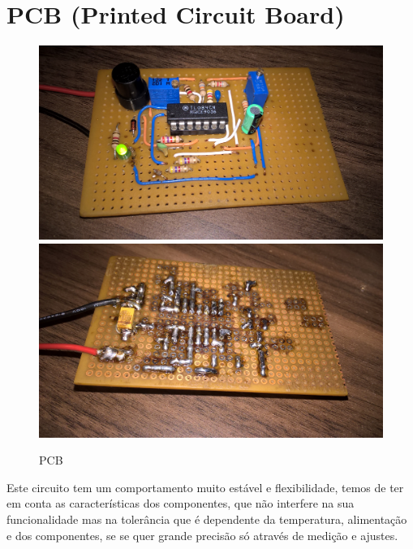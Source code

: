 \section{PCB (Printed Circuit Board)}
\begin{figure}[ht]
\begin{center}
	\includegraphics[scale=0.07]{./image/placa_1.jpg} \hspace{0.2cm}
	\includegraphics[scale=0.07]{./image/placa_2.jpg}
\end{center}
\caption{PCB}
\end{figure}\par
Este circuito tem um comportamento muito estável e flexibilidade, temos de ter em conta as características dos componentes, que não interfere na sua funcionalidade mas na tolerância que é dependente da temperatura, alimentação e dos componentes, se se quer grande precisão só através de medição e ajustes.
